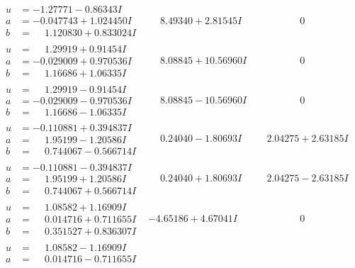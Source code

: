 \documentclass[1p]{elsarticle_modified}
\theoremstyle{definition}
\begin{document}
$$\begin{array}{c|c|c}
\begin{aligned}
u &= -1.27771 - 0.86343 I \\
a &= -0.047743 + 1.024450 I \\
b &= \phantom{-}1.120830 + 0.833024 I\end{aligned}
 & \phantom{-}8.49340 + 2.81545 I & \phantom{-0.000000 } 0 \\ \hline\begin{aligned}
u &= \phantom{-}1.29919 + 0.91454 I \\
a &= -0.029009 + 0.970536 I \\
b &= \phantom{-}1.16686 + 1.06335 I\end{aligned}
 & \phantom{-}8.08845 + 10.56960 I & \phantom{-0.000000 } 0 \\ \hline\begin{aligned}
u &= \phantom{-}1.29919 - 0.91454 I \\
a &= -0.029009 - 0.970536 I \\
b &= \phantom{-}1.16686 - 1.06335 I\end{aligned}
 & \phantom{-}8.08845 - 10.56960 I & \phantom{-0.000000 } 0 \\ \hline\begin{aligned}
u &= -0.110881 + 0.394837 I \\
a &= \phantom{-}1.95199 - 1.20586 I \\
b &= \phantom{-}0.744067 - 0.566714 I\end{aligned}
 & \phantom{-}0.24040 - 1.80693 I & \phantom{-}2.04275 + 2.63185 I \\ \hline\begin{aligned}
u &= -0.110881 - 0.394837 I \\
a &= \phantom{-}1.95199 + 1.20586 I \\
b &= \phantom{-}0.744067 + 0.566714 I\end{aligned}
 & \phantom{-}0.24040 + 1.80693 I & \phantom{-}2.04275 - 2.63185 I \\ \hline\begin{aligned}
u &= \phantom{-}1.08582 + 1.16909 I \\
a &= \phantom{-}0.014716 + 0.711655 I \\
b &= \phantom{-}0.351527 + 0.836307 I\end{aligned}
 & -4.65186 + 4.67041 I & \phantom{-0.000000 } 0 \\ \hline\begin{aligned}
u &= \phantom{-}1.08582 - 1.16909 I \\
a &= \phantom{-}0.014716 - 0.711655 I \\

\end{aligned}
\end{array}$$
\end{document}
